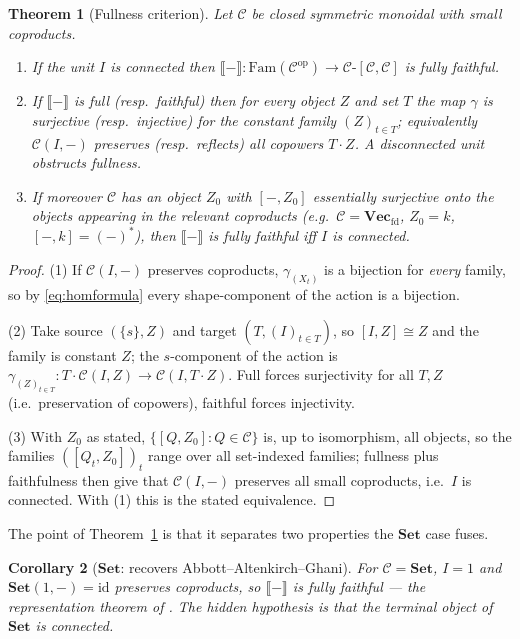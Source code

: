 \documentclass[11pt]{amsart}
\theoremstyle{plain}
\newtheorem{theorem}{Theorem}[section]
\newtheorem{corollary}[theorem]{Corollary}
\theoremstyle{definition}
\theoremstyle{remark}
\newcommand{\C}{\mathcal{C}}
\newcommand{\Set}{\mathbf{Set}}
\newcommand{\Vecfd}{\mathbf{Vec}_{\mathrm{fd}}}
\newcommand{\Fam}{\mathrm{Fam}}
\newcommand{\ext}[1]{\llbracket #1 \rrbracket}
\newcommand{\ihom}[2]{[#1,#2]}
\newcommand{\op}{\mathrm{op}}
\newcommand{\id}{\mathrm{id}}
\begin{document}
\begin{theorem}[Fullness criterion]\label{thm:T1}
Let $\C$ be closed symmetric monoidal with small coproducts.
\begin{enumerate}
\item If the unit $I$ is connected then $\ext{-}\colon\Fam(\C^\op)\to\C\text{-}[\C,\C]$ is fully
faithful.
\item If $\ext{-}$ is full (resp.\ faithful) then for every object $Z$ and set $T$ the map $\gamma$
is surjective (resp.\ injective) for the constant family $(Z)_{t\in T}$; equivalently $\C(I,-)$
preserves (resp.\ reflects) all copowers $T\cdot Z$. A disconnected unit obstructs fullness.
\item If moreover $\C$ has an object $Z_0$ with $\ihom{-}{Z_0}$ essentially surjective onto the
objects appearing in the relevant coproducts (e.g.\ $\C=\Vecfd$, $Z_0=k$, $\ihom{-}{k}=(-)^*$), then
$\ext{-}$ is fully faithful iff $I$ is connected.
\end{enumerate}
\end{theorem}
\begin{proof}
(1) If $\C(I,-)$ preserves coproducts, $\gamma_{(X_t)}$ is a bijection for \emph{every} family, so
by \eqref{eq:homformula} every shape-component of the action is a bijection.

(2) Take source $(\{s\},Z)$ and target $(T,(I)_{t\in T})$, so $\ihom{I}{Z}\cong Z$ and the family is
constant $Z$; the $s$-component of the action is $\gamma_{(Z)_{t\in T}}\colon T\cdot\C(I,Z)\to
\C(I,T\cdot Z)$. Full forces surjectivity for all $T,Z$ (i.e.\ preservation of copowers), faithful
forces injectivity.

(3) With $Z_0$ as stated, $\{\ihom{Q}{Z_0}:Q\in\C\}$ is, up to isomorphism, all objects, so the
families $(\ihom{Q_t}{Z_0})_t$ range over all set-indexed families; fullness plus faithfulness then
give that $\C(I,-)$ preserves all small coproducts, i.e.\ $I$ is connected. With (1) this is the
stated equivalence.
\end{proof}

The point of Theorem~\ref{thm:T1} is that it separates two properties the $\Set$ case fuses.

\begin{corollary}[$\Set$: recovers Abbott--Altenkirch--Ghani]\label{cor:set}
For $\C=\Set$, $I=1$ and $\Set(1,-)=\id$ preserves coproducts, so $\ext{-}$ is fully faithful ---
the representation theorem of \cite{AAG}. The hidden hypothesis is that the terminal object of
$\Set$ is connected.
\end{corollary}
\end{document}
